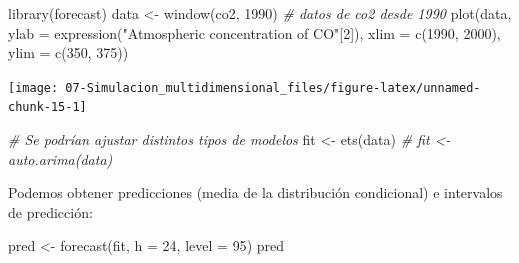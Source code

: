 \documentclass[
]{book}
\newenvironment{Shaded}{\begin{snugshade}}{\end{snugshade}}
\newcommand{\AttributeTok}[1]{\textcolor[rgb]{0.77,0.63,0.00}{#1}}
\newcommand{\CommentTok}[1]{\textcolor[rgb]{0.56,0.35,0.01}{\textit{#1}}}
\newcommand{\DecValTok}[1]{\textcolor[rgb]{0.00,0.00,0.81}{#1}}
\newcommand{\FunctionTok}[1]{\textcolor[rgb]{0.00,0.00,0.00}{#1}}
\newcommand{\NormalTok}[1]{#1}
\newcommand{\OtherTok}[1]{\textcolor[rgb]{0.56,0.35,0.01}{#1}}
\newcommand{\StringTok}[1]{\textcolor[rgb]{0.31,0.60,0.02}{#1}}
\theoremstyle{break}
\theoremstyle{definition}
\theoremstyle{definition}
\theoremstyle{definition}
\theoremstyle{definition}
\theoremstyle{remark}
\begin{document}
\begin{Shaded}
\begin{Highlighting}[]
\FunctionTok{library}\NormalTok{(forecast)}
\NormalTok{data }\OtherTok{\textless{}{-}} \FunctionTok{window}\NormalTok{(co2, }\DecValTok{1990}\NormalTok{) }\CommentTok{\# datos de co2 desde 1990}
\FunctionTok{plot}\NormalTok{(data, }\AttributeTok{ylab =} \FunctionTok{expression}\NormalTok{(}\StringTok{"Atmospheric concentration of CO"}\NormalTok{[}\DecValTok{2}\NormalTok{]),}
     \AttributeTok{xlim =} \FunctionTok{c}\NormalTok{(}\DecValTok{1990}\NormalTok{, }\DecValTok{2000}\NormalTok{), }\AttributeTok{ylim =} \FunctionTok{c}\NormalTok{(}\DecValTok{350}\NormalTok{, }\DecValTok{375}\NormalTok{))}
\end{Highlighting}
\end{Shaded}

\begin{center}\texttt{[image: 07-Simulacion\_multidimensional\_files/figure-latex/unnamed-chunk-15-1]} \end{center}

\begin{Shaded}
\begin{Highlighting}[]
\CommentTok{\# Se podrían ajustar distintos tipos de modelos}
\NormalTok{fit }\OtherTok{\textless{}{-}} \FunctionTok{ets}\NormalTok{(data)}
\CommentTok{\# fit \textless{}{-} auto.arima(data)}
\end{Highlighting}
\end{Shaded}

Podemos obtener predicciones (media de la distribución condicional) e intervalos de predicción:

\begin{Shaded}
\begin{Highlighting}[]
\NormalTok{pred }\OtherTok{\textless{}{-}} \FunctionTok{forecast}\NormalTok{(fit, }\AttributeTok{h =} \DecValTok{24}\NormalTok{, }\AttributeTok{level =} \DecValTok{95}\NormalTok{)}
\NormalTok{pred}
\end{Highlighting}
\end{Shaded}
\end{document}
